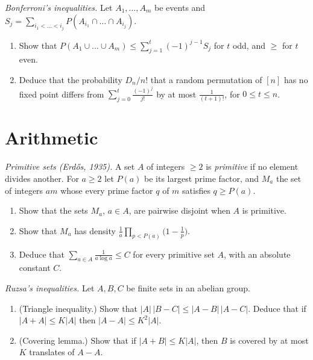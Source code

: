 \begin{exercise}[$\star$]\label{pb:bonferroni}
\emph{Bonferroni's inequalities.} Let $A_1,\dots,A_m$ be events and $S_j=\sum_{i_1<\dots<i_j}P(A_{i_1}\cap\dots\cap A_{i_j})$.
\begin{enumerate}[label=(\alph*)]
\item Show that $P(A_1\cup\dots\cup A_m)\le\sum_{j=1}^t(-1)^{j-1}S_j$ for $t$ odd, and $\ge$ for $t$ even.
\item Deduce that the probability $D_n/n!$ that a random permutation of $[n]$ has no fixed point differs from $\sum_{j=0}^t\frac{(-1)^j}{j!}$ by at
most $\frac1{(t+1)!}$, for $0\le t\le n$.
\end{enumerate}
\end{exercise}

\section{Arithmetic}

\begin{exercise}[$\star\star$]\label{pb:primitive}
\emph{Primitive sets (Erdős, 1935).} A set $A$ of integers $\ge2$ is \emph{primitive} if no element divides another. For $a\ge2$ let $P(a)$ be
its largest prime factor, and $M_a$ the set of integers $am$ whose every prime factor $q$ of $m$ satisfies $q\ge P(a)$.
\begin{enumerate}[label=(\alph*)]
\item Show that the sets $M_a$, $a\in A$, are pairwise disjoint when $A$ is primitive.
\item Show that $M_a$ has density $\frac1a\prod_{p<P(a)}\bigl(1-\frac1p\bigr)$.
\item Deduce that $\sum_{a\in A}\frac1{a\log a}\le C$ for every primitive set $A$, with an absolute constant $C$.
\end{enumerate}
\end{exercise}

\begin{exercise}[$\star\star$]\label{pb:ruzsa}
\emph{Ruzsa's inequalities.} Let $A,B,C$ be finite sets in an abelian group.
\begin{enumerate}[label=(\alph*)]
\item (Triangle inequality.) Show that $|A|\,|B-C|\le|A-B|\,|A-C|$. Deduce that if $|A+A|\le K|A|$ then $|A-A|\le K^2|A|$.
\item (Covering lemma.) Show that if $|A+B|\le K|A|$, then $B$ is covered by at most $K$ translates of $A-A$.
\end{enumerate}
\end{exercise}

